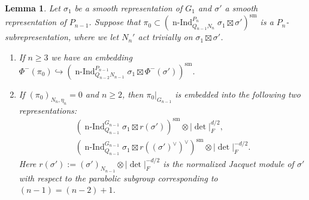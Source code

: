 \documentclass[a4paper]{amsart}
\numberwithin{equation}{section}
\newtheorem{lem}[thm]{Lemma}
\theoremstyle{remark}
\theoremstyle{definition}
\DeclareMathOperator{\nInd}{n-Ind}
\newcommand{\sm}{\mathrm{sm}}
\begin{document}
\begin{lem}\label{lem:embedding of derivative}
Let $\sigma_1$ be a smooth representation of $G_1$ and $\sigma'$ a smooth representation of $P_{n - 1}$.
Suppose that $\pi_{0}\subset (\nInd_{Q_{n - 1}N_{n}}^{P_{n}}\sigma_{1}\boxtimes\sigma')^{\sm}$ is a $P_{n}$-subrepresentation, where we let $N_n'$ act trivially on $\sigma_{1}\boxtimes\sigma'$.
\begin{enumerate}
\item If $n \ge 3$ we have an embedding $\Phi^{-}(\pi_{0})\hookrightarrow (\nInd_{Q_{n - 2}N_{n-1}}^{P_{n-1}}\sigma_{1}\boxtimes\Phi^{-}(\sigma'))^{\sm}$.
\item If $(\pi_{0})_{N_{n},\eta_{n}} = 0$ and $n \ge 2$, then $\pi_{0}|_{G_{n - 1}}$ is embedded into the following two representations:
\begin{gather*}
(\nInd_{Q_{n - 1}}^{G_{n - 1}}\sigma_{1}\boxtimes r(\sigma'))^{\sm}\otimes \lvert \det\rvert_{F}^{d/2},\\
(\nInd_{Q_{n - 1}}^{G_{n - 1}}\sigma_{1}\boxtimes r((\sigma')^{\vee})^{\vee})^{\sm}\otimes \lvert\det\rvert_{F}^{-d/2}.
\end{gather*}
Here $r(\sigma') := (\sigma')_{N_{n - 1}}\otimes\lvert \det\rvert^{-d/2}_{F}$ is the normalized Jacquet module of $\sigma'$ with respect to the parabolic subgroup corresponding to $(n - 1) = (n - 2) + 1$.
\end{enumerate}
\end{lem}
\end{document}
